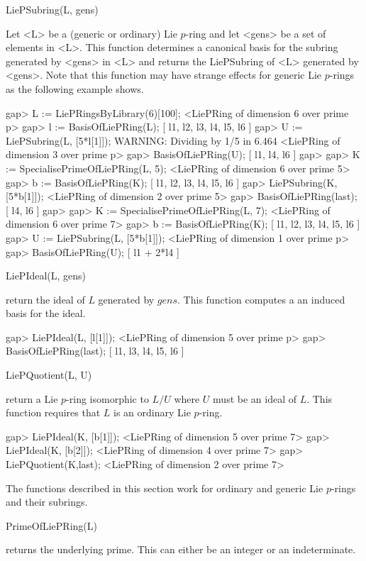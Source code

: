 \> LiePSubring(L, gens)

Let <L> be a (generic or ordinary) Lie $p$-ring and let <gens> be a set of 
elements in <L>. This function determines a canonical basis for the subring
generated by <gens> in <L> and returns the LiePSubring of <L> generated by
<gens>. Note that this function may have strange effects for generic Lie
$p$-rings as the following example shows.

\beginexample
gap> L := LiePRingsByLibrary(6)[100];
<LiePRing of dimension 6 over prime p>
gap> l := BasisOfLiePRing(L);
[ l1, l2, l3, l4, l5, l6 ]
gap> U := LiePSubring(L, [5*l[1]]);
WARNING: Dividing by 1/5 in 6.464
<LiePRing of dimension 3 over prime p>
gap> BasisOfLiePRing(U);
[ l1, l4, l6 ]
gap> 
gap>  K := SpecialisePrimeOfLiePRing(L, 5);
<LiePRing of dimension 6 over prime 5>
gap>  b := BasisOfLiePRing(K);
[ l1, l2, l3, l4, l5, l6 ]
gap> LiePSubring(K, [5*b[1]]);
<LiePRing of dimension 2 over prime 5>
gap>  BasisOfLiePRing(last);
[ l4, l6 ]
gap> 
gap> K := SpecialisePrimeOfLiePRing(L, 7);
<LiePRing of dimension 6 over prime 7>
gap> b := BasisOfLiePRing(K);
[ l1, l2, l3, l4, l5, l6 ]
gap> U := LiePSubring(L, [5*b[1]]);
<LiePRing of dimension 1 over prime p>
gap> BasisOfLiePRing(U);
[ l1 + 2*l4 ]
\endexample

\> LiePIdeal(L, gens)

return the ideal of $L$ generated by $gens$. This function computes a
an induced basis for the ideal.

\beginexample
gap> LiePIdeal(L, [l[1]]);
<LiePRing of dimension 5 over prime p>
gap> BasisOfLiePRing(last);
[ l1, l3, l4, l5, l6 ]
\endexample

\> LiePQuotient(L, U)

return a Lie $p$-ring isomorphic to $L/U$ where $U$ must be an ideal of
$L$. This function requires that $L$ is an ordinary Lie $p$-ring.

\beginexample
gap> LiePIdeal(K, [b[1]]);
<LiePRing of dimension 5 over prime 7>
gap> LiePIdeal(K, [b[2]]);
<LiePRing of dimension 4 over prime 7>
gap> LiePQuotient(K,last);
<LiePRing of dimension 2 over prime 7>
\endexample


The functions described in this section work for ordinary and generic
Lie $p$-rings and their subrings.

\> PrimeOfLiePRing(L)

returns the underlying prime. This can either be an integer or an
indeterminate.

